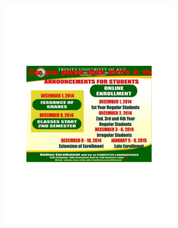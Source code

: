 \documentclass[sigconf]{acmart}
\begin{document}
\begin{figure}[hbp]
        \centering
        \begin{subfigure}[b]{0.3\columnwidth}
                \includegraphics[width=\textwidth]{images/reading_1.pdf}  
        \end{subfigure}%
        ~ 
        \begin{subfigure}[b]{0.3\columnwidth}

\end{subfigure}
\end{figure}
\end{document}
